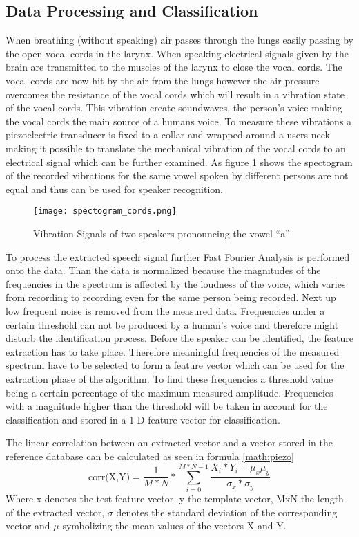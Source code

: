 \documentclass[12pt]{article}
\begin{document}
\subsection{Data Processing and Classification}
When breathing (without speaking) air passes through the lungs easily passing by the open vocal cords in the larynx. When speaking electrical signals given by the brain are transmitted to the muscles of the larynx to close the vocal cords. The vocal cords are now hit by the air from the lungs however the air pressure overcomes the resistance of the vocal cords which will result in a vibration state of the vocal cords. This vibration create soundwaves, the person's voice making the vocal cords the main source of a humans voice.
To measure these vibrations a piezoelectric transducer is fixed to a collar and wrapped around a users neck making it possible to translate the mechanical vibration of the vocal cords to an electrical signal which can be further examined. 
As figure \ref{fig:piezo} shows the spectogram of the recorded vibrations for the same vowel spoken by different persons are not equal and thus can be used for speaker recognition. 
\begin{figure}[h!]
	\texttt{[image: spectogram\_cords.png]}
	\caption[Vibration Signals of two speakers pronouncing the vowel a Taken from: \cite{piezo} ]{Vibration Signals of two speakers pronouncing the vowel ``a''}
	\label{fig:piezo}
\end{figure}  
To process the  extracted speech signal further Fast Fourier Analysis is performed onto the data. Than the data is normalized because the magnitudes of the frequencies in the spectrum is affected by the loudness of the voice, which varies from recording to recording even for the same person being recorded.
Next up low frequent noise is removed from the measured data.  Frequencies under a certain threshold can not be produced by a human's voice and therefore might disturb the identification process. Before the speaker can be identified, the feature extraction has to take place. Therefore meaningful frequencies of the measured spectrum have to be selected to form a feature vector which can be used for the extraction phase of the algorithm. To find these frequencies a threshold value being a certain percentage of the maximum measured amplitude. Frequencies with a magnitude higher than the threshold will be taken in account for the classification and stored in a 1-D feature vector for classification.\cite{piezo}

 The linear correlation between an extracted vector and a vector stored in the reference database can be calculated as seen in formula \ref{math:piezo}
\begin{equation}
\text{corr(X,Y)}=\frac{1}{M*N}*\sum_{i=0}^{M*N-1} \frac{X_{i}*Y_{i}-\mu_{x}\mu_{y}}{\sigma_{x}*\sigma_{y}}
\label{math:piezo}
\end{equation}
\newpage
Where x denotes the test feature vector, y the template vector, MxN the length of the extracted vector, \(\sigma\) denotes the standard deviation of the corresponding vector and \(\mu\) symbolizing the mean values of the vectors X and Y. 
\end{document}
